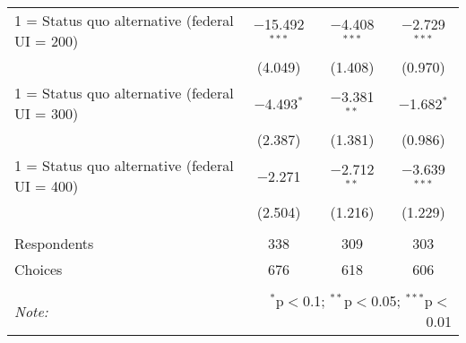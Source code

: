 \begin{table}[!htbp]
\begin{tabular}{@{\extracolsep{5pt}}lccc}
  1 = Status quo alternative (federal UI = 200) & $-$15.492$^{***}$ & $-$4.408$^{***}$ & $-$2.729$^{***}$ \\ 
  & (4.049) & (1.408) & (0.970) \\ 
  1 = Status quo alternative (federal UI = 300) & $-$4.493$^{*}$ & $-$3.381$^{**}$ & $-$1.682$^{*}$ \\ 
  & (2.387) & (1.381) & (0.986) \\ 
  1 = Status quo alternative (federal UI = 400) & $-$2.271 & $-$2.712$^{**}$ & $-$3.639$^{***}$ \\ 
  & (2.504) & (1.216) & (1.229) \\ 
 \hline \\[-1.8ex] 
Respondents & 338 & 309 & 303\\ 
 Choices & 676 & 618 & 606\\ 
\hline 
\hline \\[-1.8ex] 
\textit{Note:}  & \multicolumn{3}{r}{$^{*}$p$<$0.1; $^{**}$p$<$0.05; $^{***}$p$<$0.01} \\ 
\end{tabular} 
\end{table} 
